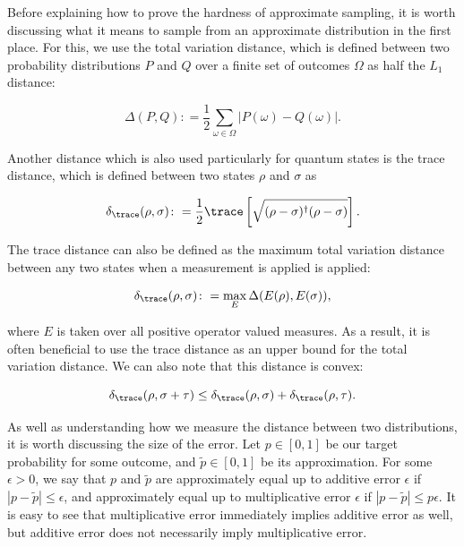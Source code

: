 Before explaining how to prove the hardness of approximate sampling, it is worth discussing what it means to sample from an approximate distribution in the first place. For this, we use the total variation distance, which is defined between two probability distributions $P$ and $Q$ over a finite set of outcomes $\Omega$ as half the $L_1$ distance:

\begin{equation}
\Delta(P, Q) \colon= \frac{1}{2}\sum_{\omega \in \Omega}|P(\omega) - Q(\omega)|.
\end{equation}

Another distance which is also used particularly for quantum states is the trace distance, which is defined between two states $\rho$ and $\sigma$ as

\begin{equation}
\delta_{\trace}(\rho, \sigma) \colon= \frac{1}{2}\trace\left[\sqrt{(\rho-\sigma)^\dagger(\rho-\sigma)}\right].
\end{equation}

The trace distance can also be defined as the maximum total variation distance between any two states when a measurement is applied is applied:

\begin{equation}
\delta_{\trace}(\rho, \sigma) \colon= \max_E\Delta(E(\rho), E(\sigma)),
\end{equation}

\noindent where $E$ is taken over all positive operator valued measures. As a result, it is often beneficial to use the trace distance as an upper bound for the total variation distance. We can also note that this distance is convex:

\begin{equation}
\delta_{\trace}(\rho, \sigma + \tau) \leq \delta_{\trace}(\rho, \sigma) + \delta_{\trace}(\rho, \tau).
\end{equation}

As well as understanding how we measure the distance between two distributions, it is worth discussing the size of the error. Let $p \in [0,1]$ be our target probability for some outcome, and $\tilde{p} \in [0,1]$ be its approximation. For some $\epsilon > 0$, we say that $p$ and $\tilde{p}$ are approximately equal up to additive error $\epsilon$ if $|p-\tilde{p}|\leq \epsilon$, and approximately equal up to multiplicative error $\epsilon$ if $|p-\tilde{p}|\leq p\epsilon$. It is easy to see that multiplicative error immediately implies additive error as well, but additive error does not necessarily imply multiplicative error.


